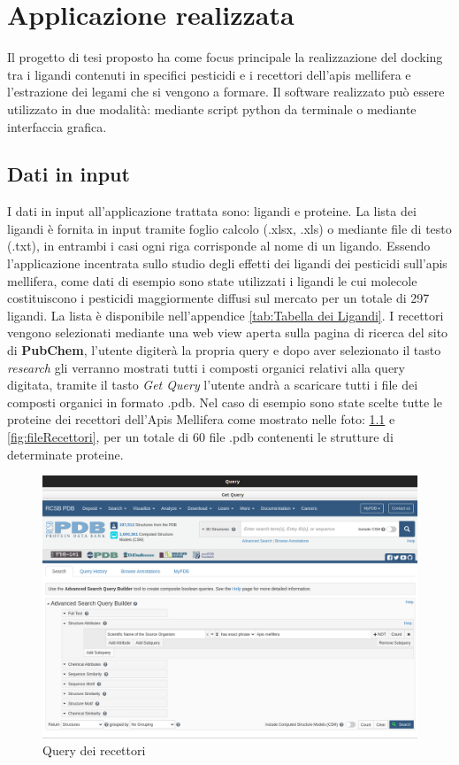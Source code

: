 \def\baselinestretch{1}
\chapter{Applicazione realizzata} \label{cap3}
\def\baselinestretch{1.66}
\noindent Il progetto di tesi proposto ha come focus principale la realizzazione del docking tra i ligandi contenuti in specifici pesticidi e i recettori dell'apis mellifera e l'estrazione dei legami che si vengono a formare. Il software realizzato può essere utilizzato in due modalità: mediante script python da terminale o mediante interfaccia grafica. 

\section{Dati in input}
\def\baselinestretch{1.66}
\noindent I dati in input all'applicazione trattata sono: ligandi e proteine. La lista dei ligandi è fornita in input tramite foglio calcolo (.xlsx, .xls) o mediante file di testo (.txt), in entrambi i casi ogni riga corrisponde al nome di un ligando. Essendo l'applicazione incentrata sullo studio degli effetti dei ligandi dei pesticidi sull'apis mellifera, come dati di esempio sono state utilizzati i ligandi le cui molecole costituiscono i pesticidi maggiormente diffusi 
sul mercato %
per un totale di 297 ligandi. La lista è disponibile nell'appendice \ref{tab:Tabella dei Ligandi}.\newline
I recettori vengono selezionati mediante una web view aperta sulla pagina di ricerca del sito di \textbf{PubChem}, l'utente digiterà la propria query e dopo aver selezionato il tasto \textit{research} gli verranno mostrati tutti i composti organici relativi alla query digitata, tramite il tasto \textit{Get Query} l'utente andrà a scaricare tutti i file dei composti organici in formato .pdb. Nel caso di esempio sono state scelte tutte le proteine dei recettori dell'Apis Mellifera come mostrato nelle foto: \ref{fig:queryRecettori} e \ref{fig:fileRecettori}, per un totale di 60 file .pdb contenenti le strutture di determinate proteine.
\begin{figure}[H]
    \centering
    \includegraphics[scale=0.4]{immagini/queryRecettori.png}
    \caption{Query dei recettori}
    \label{fig:queryRecettori}
\end{figure}

